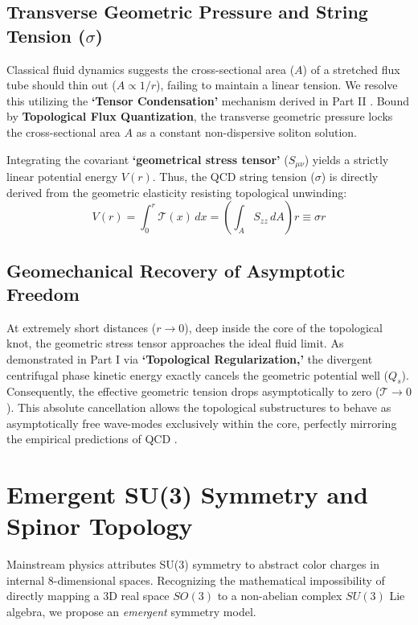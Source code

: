 \documentclass[reprint,amsmath,amssymb,aps,prd]{revtex4-2}
\begin{document}
\subsection{Transverse Geometric Pressure and String Tension ($\sigma$)}
Classical fluid dynamics suggests the cross-sectional area ($A$) of a stretched flux tube should thin out ($A \propto 1/r$), failing to maintain a linear tension. We resolve this utilizing the \textbf{`Tensor Condensation'} mechanism derived in Part II \cite{YooPart2}. Bound by \textbf{Topological Flux Quantization}, the transverse geometric pressure locks the cross-sectional area $A$ as a constant non-dispersive soliton solution.

Integrating the covariant \textbf{`geometrical stress tensor'} ($S_{\mu\nu}$) yields a strictly linear potential energy $V(r)$. Thus, the QCD string tension ($\sigma$) \cite{Wilson1974} is directly derived from the geometric elasticity resisting topological unwinding:
\begin{equation}
V(r) = \int_{0}^{r} \mathcal{T}(x) \, dx = \left( \int_A S_{zz} \, dA \right) r \equiv \sigma r
\end{equation}

\subsection{Geomechanical Recovery of Asymptotic Freedom}
At extremely short distances ($r \to 0$), deep inside the core of the topological knot, the geometric stress tensor approaches the ideal fluid limit. As demonstrated in Part I via \textbf{`Topological Regularization,'} the divergent centrifugal phase kinetic energy exactly cancels the geometric potential well ($Q_s$). Consequently, the effective geometric tension drops asymptotically to zero ($\mathcal{T} \to 0$). This absolute cancellation allows the topological substructures to behave as asymptotically free wave-modes exclusively within the core, perfectly mirroring the empirical predictions of QCD \cite{Gross1973}.

\section{Emergent SU(3) Symmetry and Spinor Topology}

Mainstream physics attributes SU(3) symmetry to abstract color charges in internal 8-dimensional spaces. Recognizing the mathematical impossibility of directly mapping a 3D real space $SO(3)$ to a non-abelian complex $SU(3)$ Lie algebra, we propose an \textit{emergent} symmetry model.
\end{document}
